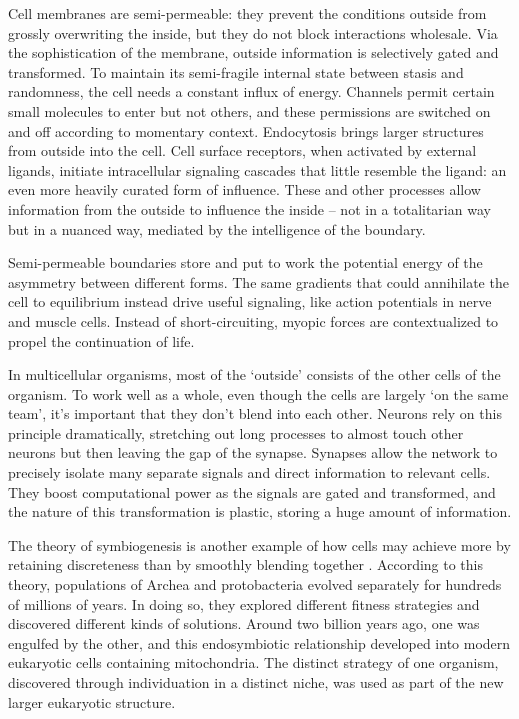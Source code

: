 \documentclass[12pt]{article}
\begin{document}
Cell membranes are semi-permeable: they prevent the conditions outside from grossly overwriting the inside, but they do not block interactions wholesale. Via the sophistication of the membrane, outside information is selectively gated and transformed. To maintain its semi-fragile internal state between stasis and randomness, the cell needs a constant influx of energy. Channels permit certain small molecules to enter but not others, and these permissions are switched on and off according to momentary context. Endocytosis brings larger structures from outside into the cell. Cell surface receptors, when activated by external ligands, initiate intracellular signaling cascades that little resemble the ligand: an even more heavily curated form of influence. These and other processes allow information from the outside to influence the inside -- not in a totalitarian way but in a nuanced way, mediated by the intelligence of the boundary. 

Semi-permeable boundaries store and put to work the potential energy of the asymmetry between different forms. The same gradients that could annihilate the cell to equilibrium instead drive useful signaling, like action potentials in nerve and muscle cells. Instead of short-circuiting, myopic forces are contextualized to propel the continuation of life.


In multicellular organisms, most of the `outside' consists of the other cells of the organism. To work well as a whole, even though the cells are largely `on the same team', it's important that they don't blend into each other. Neurons rely on this principle dramatically, stretching out long processes to almost touch other neurons but then leaving the gap of the synapse. Synapses allow the network to precisely isolate many separate signals and direct information to relevant cells. They boost computational power as the signals are gated and transformed, and the nature of this transformation is plastic, storing a huge amount of information. 

The theory of symbiogenesis is another example of how cells may achieve more by retaining discreteness than by smoothly blending together \citep{margulis1995what, margulis1986microcosmos, sapp1994evolution, lane2010energetics}. According to this theory, populations of Archea and protobacteria evolved separately for hundreds of millions of years. In doing so, they explored different fitness strategies and discovered different kinds of solutions. Around two billion years ago, one was engulfed by the other, and this endosymbiotic relationship developed into modern eukaryotic cells containing mitochondria. The distinct strategy of one organism, discovered through individuation in a distinct niche, was used as part of the new larger eukaryotic structure.
\end{document}
